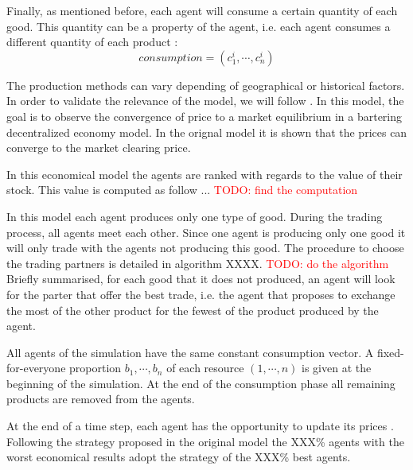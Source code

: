 \documentclass{wscpaperproc}
\newcommand{\memo}[2]{\textcolor{#1}{#2}}
\newcommand{\todo}[1]{\memo{red}{TODO: #1\\}}
\begin{document}


 
Finally, as mentioned before, each agent will consume a certain quantity of each good. This quantity can be a property of the agent, i.e. each agent consumes a different quantity of each product :
$$ consumption = (c^i_1, \cdots, c^i_n) $$ 

The production methods can vary depending of geographical or historical factors. In order to validate the relevance of the model, we will follow \cite{gintis_emergence_2006}. In this model, the goal is to observe the convergence of price to a market equilibrium in a bartering decentralized economy model. In the orignal model it is shown that the prices can converge to the market clearing price.

In this economical model the agents are ranked with regards to the value of their stock. This value is computed as follow ...
\todo{find the computation}

In this model each agent produces only one type of good. During the trading process, all agents meet each other. Since one agent is producing only one good it will only trade with the agents not producing this good. The procedure to choose the trading partners is detailed in algorithm XXXX.
\todo{do the algorithm}
Briefly summarised, for each good that it does not produced, an agent will look for the parter that offer the best trade, i.e. the agent that proposes to exchange the most of the other product for the fewest of the product produced by the agent.

All agents of the simulation have the same constant consumption vector. A fixed-for-everyone proportion $b_1,\cdots,b_n$ of each resource $(1, \cdots, n)$ is given at the beginning of the simulation. At the end of the consumption phase all remaining products are removed from the agents.

At the end of a time step, each agent has the opportunity to update its prices . Following the strategy proposed in the original model the XXX\% agents with the worst economical results adopt the strategy of the XXX\% best agents.
\end{document}
